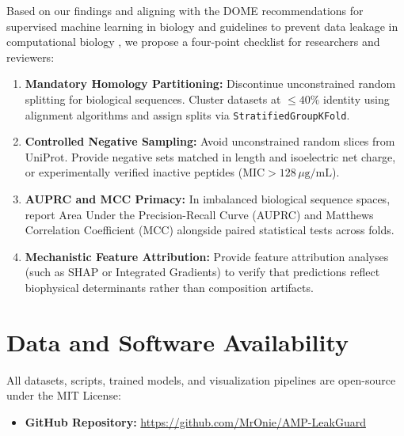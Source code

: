 \documentclass[11pt,a4paper]{article}
\begin{document}
Based on our findings and aligning with the DOME recommendations for supervised machine learning in biology \cite{walsh2021dome} and guidelines to prevent data leakage in computational biology \cite{bernett2024guiding, kapoor2023leakage, whalen2022navigating}, we propose a four-point checklist for researchers and reviewers:
\begin{enumerate}
    \item \textbf{Mandatory Homology Partitioning:} Discontinue unconstrained random splitting for biological sequences. Cluster datasets at $\le 40\%$ identity using alignment algorithms and assign splits via \texttt{StratifiedGroupKFold}.
    \item \textbf{Controlled Negative Sampling:} Avoid unconstrained random slices from UniProt. Provide negative sets matched in length and isoelectric net charge, or experimentally verified inactive peptides ($\text{MIC} > 128\,\mu\text{g/mL}$).
    \item \textbf{AUPRC and MCC Primacy:} In imbalanced biological sequence spaces, report Area Under the Precision-Recall Curve (AUPRC) and Matthews Correlation Coefficient (MCC) \cite{chicco2020advantages} alongside paired statistical tests across folds.
    \item \textbf{Mechanistic Feature Attribution:} Provide feature attribution analyses (such as SHAP or Integrated Gradients) to verify that predictions reflect biophysical determinants rather than composition artifacts.
\end{enumerate}

\section{Data and Software Availability}

All datasets, scripts, trained models, and visualization pipelines are open-source under the MIT License:
\begin{itemize}
    \item \textbf{GitHub Repository:} \url{https://github.com/MrOnie/AMP-LeakGuard}
\end{itemize}



\end{document}
